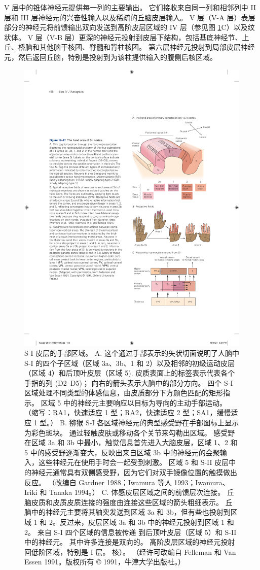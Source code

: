 V 层中的锥体神经元提供每一列的主要输出。 
它们接收来自同一列和相邻列中 II 层和 III 层神经元的兴奋性输入以及稀疏的丘脑皮层输入。 
V 层（V-A 层）表层部分的神经元将前馈输出双向发送到高阶皮层区域的 IV 层（参见图 \ref{fig:19_17}C）以及纹状体。 
V 层（V-B 层）更深的神经元投射到皮层下结构，包括基底神经节、上丘、桥脑和其他脑干核团、脊髓和背柱核团。 
第六层神经元投射到局部皮层神经元，然后返回丘脑，特别是投射到为该柱提供输入的腹侧后核区域。

\begin{figure}[htbp]
	\centering
	\includegraphics[width=0.5\linewidth]{chap19/fig_19_17}
	\caption{S-I 皮层的手部区域。 
		A. 这个通过手部表示的矢状切面说明了人脑中 S-I 的四个子区域（区域 3a、3b、1 和 2）以及相邻的初级运动皮层（区域 4）和后顶叶皮层（区域 5). 皮质表面上的标签表示代表各个手指的列 (D2–D5)； 向右的箭头表示大脑中的部分方向。 
		四个 S-I 区域处理不同类型的体感信息，由皮质部分下方颜色匹配的矩形指示。 
		区域 5 中的神经元主要响应以目标为导向的主动手部运动。 （缩写：RA1，快速适应 1 型；RA2，快速适应 2 型；SA1，缓慢适应 1 型。） 
		B. 猕猴 S-I 各区域神经元的典型感受野在手部图标上显示为彩色斑块。 
		通过轻触皮肤或移动各个关节来勾勒出区域。 
		感受野在区域 3a 和 3b 中最小，触觉信息首先进入大脑皮层，区域 1、2 和 5 中的感受野逐渐变大，反映出来自区域 3b 中的神经元的会聚输入，这些神经元在使用手时会一起受到刺激。 
		区域 5 和 S-II 皮层中的神经元通常具有双侧感受野，因为它们对双手镜像位置的触摸做出反应。 （改编自 Gardner 1988；Iwamura 等人 1993；Iwamura、Iriki 和 Tanaka 1994。）
		C. 体感皮层区域之间的前馈层次连接。 丘脑皮质和皮质皮质连接的强度由连接这些区域的箭头粗细表示。 
		丘脑中的神经元主要将其轴突发送到区域 3a 和 3b，但有些也投射到区域 1 和 2。反过来，皮层区域 3a 和 3b 中的神经元投射到区域 1 和 2。
		来自 S-I 四个区域的信息被传递 到后顶叶皮层（区域 5）和 S-II 中的神经元。 
		其中许多连接是双向的。 高阶皮层区域的神经元投射回低阶区域，特别是 I 层。 核）。 （经许可改编自 Felleman 和 Van Essen 1991。版权所有 © 1991，牛津大学出版社。）}
	\label{fig:19_17}
\end{figure}


